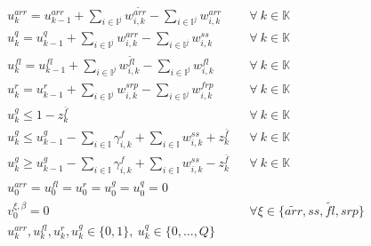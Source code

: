 \documentclass[]{interact}
\theoremstyle{plain}%
\theoremstyle{definition}
\theoremstyle{remark}
\begin{document}
\begin{eqnarray}
u^{arr}_k=u^{arr}_{k-1}+ \sum_{i\in\mathbb{I}^j}w^{\tilde{arr}}_{i,k}-\sum_{i\in\mathbb{I}^j}w^{arr}_{i,k}&&\forall\ k\in \mathbb{K}\label{fail:E1}\\
u^{q}_k=u^{q}_{k-1}+ \sum_{i\in\mathbb{I}^j}w^{arr}_{i,k}-\sum_{i\in\mathbb{I}^j}w^{ss}_{i,k}&&\forall\ k\in \mathbb{K}\label{fail:E2}\\
u^{fl}_k=u^{fl}_{k-1}+ \sum_{i\in\mathbb{I}^j}w^{\tilde{fl}}_{i,k}-\sum_{i\in\mathbb{I}^j}w^{fl}_{i,k}&&\forall\ k\in \mathbb{K}\label{fail:E3}\\
u^{r}_k=u^{r}_{k-1}+ \sum_{i\in\mathbb{I}^j}w^{srp}_{i,k}-\sum_{i\in\mathbb{I}^j}w^{frp}_{i,k}&&\forall\ k\in \mathbb{K}\label{fail:E4}\\
u^{g}_k \le 1-z^{\bar{f}}_{k}&&\forall\ k\in \mathbb{K}\label{fail:E5}\\
u^{g}_k\le u^{g}_{k-1}- \sum_{i\in \mathbb{I}} \gamma^{f}_{i,k} +\sum_{i\in \mathbb{I}} w^{ss}_{i,k} + z^{\bar{f}}_{k}&&\forall\ k\in \mathbb{K}\label{fail:E6}\\
u^{g}_k\ge u^{g}_{k-1}-  \sum_{i\in \mathbb{I}} \gamma^{f}_{i,k} +\sum_{i\in \mathbb{I}} w^{ss}_{i,k}  - z^{\bar{f}}_{k}&&\forall\ k\in \mathbb{K}\label{fail:E7}\\
u^{arr}_0=u^{fl}_0=u^{r}_0=u^{g}_0=u^{q}_0=0\nonumber\\
v^{\xi,\beta}_0=0&& \forall \xi \in\{\tilde{arr},ss,\tilde{fl},srp\}\nonumber\\
u^{arr}_k,u^{fl}_k,u^{r}_k,u^{g}_k\in\{0,1\},\ u^{q}_k\in\{0,...,Q\}\nonumber
\end{eqnarray}
\end{document}
